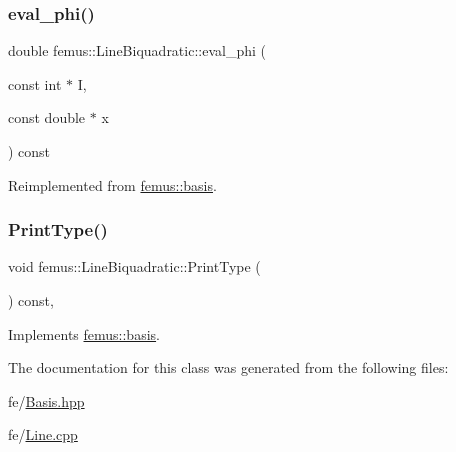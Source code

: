 \mbox{\label{classfemus_1_1_line_biquadratic_aaea2d87519c0e65678685ab1c64e65f9}} 
\subsubsection{\texorpdfstring{eval\+\_\+phi()}{eval\_phi()}}
{\footnotesize\ttfamily double femus\+::\+Line\+Biquadratic\+::eval\+\_\+phi (\begin{DoxyParamCaption}\item[{const int $\ast$}]{I,  }\item[{const double $\ast$}]{x }\end{DoxyParamCaption}) const\hspace{0.3cm}{\ttfamily [virtual]}}



Reimplemented from \mbox{\hyperlink{classfemus_1_1basis_a89b0797cdccffae5ff6d059b32016ae5}{femus\+::basis}}.

\mbox{\label{classfemus_1_1_line_biquadratic_a54463fff187f1fb64a4252c16bae0afe}} 
\subsubsection{\texorpdfstring{Print\+Type()}{PrintType()}}
{\footnotesize\ttfamily void femus\+::\+Line\+Biquadratic\+::\+Print\+Type (\begin{DoxyParamCaption}{ }\end{DoxyParamCaption}) const\hspace{0.3cm}{\ttfamily [inline]}, {\ttfamily [virtual]}}



Implements \mbox{\hyperlink{classfemus_1_1basis_abbae7bf8f31ec5793c911bc6d4ea0572}{femus\+::basis}}.



The documentation for this class was generated from the following files\+:\begin{DoxyCompactItemize}
\item 
fe/\mbox{\hyperlink{_basis_8hpp}{Basis.\+hpp}}\item 
fe/\mbox{\hyperlink{fe_2_line_8cpp}{Line.\+cpp}}\end{DoxyCompactItemize}
